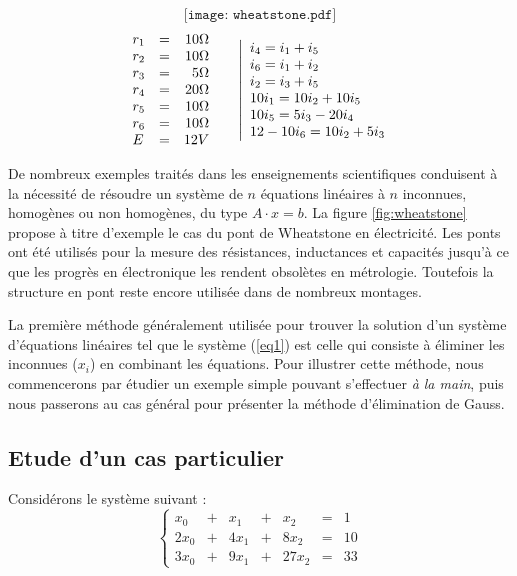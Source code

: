 \begin{fig}\label{fig:wheatstone}
$$\texttt{[image: wheatstone.pdf]}$$
$$
\begin{array}{lcr}
r_1 & = & 10 \Omega \\
r_2 & = & 10 \Omega \\
r_3 & = &  5 \Omega \\
r_4 & = & 20 \Omega \\
r_5 & = & 10 \Omega \\
r_6 & = & 10 \Omega \\
E   & = & 12 V 
\end{array}
\hspace*{5mm}
\left|\begin{array}{l}
i_4 = i_1 + i_5\\
i_6 = i_1 + i_2\\
i_2 = i_3 + i_5\\
10 i_1 = 10 i_2 + 10 i_5\\
10 i_5 = 5 i_3 - 20 i_4\\
12 - 10 i_6 = 10 i_2 + 5 i_3
\end{array}\right.
$$
\end{fig}

De nombreux exemples traités dans les enseignements scientifiques
conduisent à la nécessité de résoudre un système de $n$ équations linéaires
à $n$ inconnues, homogènes ou non homogènes, du type $A\cdot x = b$. 
La figure \ref{fig:wheatstone}
propose à titre d'exemple le cas du pont de Wheatstone en électricité.
Les ponts ont été utilisés pour la mesure des résistances, inductances et
capacités jusqu'à ce que les progrès en électronique les rendent obsolètes en
métrologie. Toutefois la structure en pont reste encore utilisée dans de 
nombreux montages.

La première méthode généralement utilisée pour trouver la solution 
d'un système d'équa\-tions linéaires tel que le système (\ref{eq1}) 
est celle qui consiste à éliminer les inconnues 
($x_i$) en combinant les équations.
Pour illustrer cette méthode, nous commencerons par étudier un exemple
simple pouvant s'effectuer {\em à la main}, 
puis nous passerons au cas général pour
présenter la méthode d'élimination de {\sc Gauss}.

\subsection*{Etude d'un cas particulier}
\label{casparticulier}
Considérons le système suivant :
$$\left\{
\begin{array}{rcrcrcr}
 x_0 & + &  x_1 & + &   x_2 & = &  1 \\
2x_0 & + & 4x_1 & + &  8x_2 & = & 10 \\
3x_0 & + & 9x_1 & + & 27x_2 & = & 33
\end{array}
\right.$$

